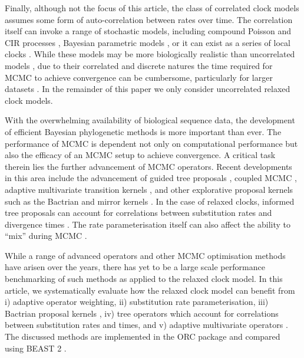 \documentclass[10pt,letterpaper]{article}
\begin{document}
Finally, although not the focus of this article, the class of correlated clock models assumes some form of auto-correlation between rates over time. 
The correlation itself can invoke a range of stochastic models, including compound Poisson \cite{huelsenbeck2000compound} and CIR processes \cite{lepage2007general}, Bayesian parametric models \cite{thorne1998estimating}, or it can exist as a series of local clocks \cite{yoder2000estimation, drummond2010bayesian}. 
While these models may be more biologically realistic than uncorrelated models \cite{lepage2007general}, due to their correlated and discrete natures the time required for MCMC to achieve convergence can be cumbersome, particularly for larger datasets \cite{drummond2010bayesian}.  
In the remainder of this paper we only consider uncorrelated relaxed clock models.


With the overwhelming availability of biological sequence data, the development of efficient Bayesian phylogenetic methods is more important than ever. 
The performance of MCMC is dependent not only on computational performance but also the efficacy of an
MCMC setup to achieve convergence.
A critical task therein lies the further advancement of MCMC operators.
Recent developments in this area include the advancement of guided tree proposals \cite{zhang2020using, meyer2019adaptive, hohna2012guided}, coupled MCMC \cite{altekar2004parallel, muller2019coupled},
adaptive multivariate transition kernels \cite{baele2017adaptive},
and other explorative proposal kernels such as the Bactrian and mirror kernels \cite{yang2013searching, thawornwattana2018designing}.
In the case of relaxed clocks, informed tree proposals can account for correlations between substitution rates and divergence times \cite{zhang2020improving}. 
The rate parameterisation itself can also affect the ability to ``mix'' during MCMC \cite{drummond2006relaxed, li2012model, zhang2020improving}. 




While a range of advanced operators and other MCMC optimisation methods have arisen over the years, there has yet to be a large scale performance benchmarking of such methods as applied to the relaxed clock model. 
In this article, we systematically evaluate how the relaxed clock model can benefit from i) adaptive operator weighting, ii) substitution rate parameterisation,  iii) Bactrian proposal kernels \cite{yang2013searching}, iv) tree operators which account for correlations between substitution rates and times, and v) adaptive multivariate operators \cite{baele2017adaptive}.
The discussed methods are implemented in the ORC package and compared using BEAST 2 \cite{bouckaert2019beast}.
\end{document}
